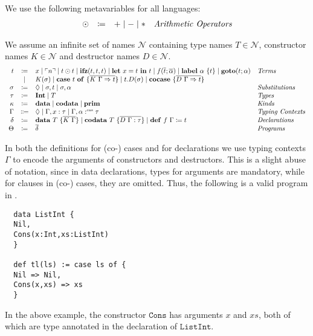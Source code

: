\begin{definition}
  We use the following metavariables for all languages:
  \[
    \begin{array}{rcll}
      \odot  & \coloneqq & + \mid - \mid * & \emph{Arithmetic Operators}
    \end{array}
  \]
\end{definition}

\begin{definition}
  We assume an infinite set of names $\mathcal{N}$ containing type names $T\in\mathcal{N}$, constructor names $K\in\mathcal{N}$ and destructor names $D\in\mathcal{N}$.
  \[ 
    \begin{array}{r c l l}
      t & \coloneqq & x \mid \lit{n} \mid t \odot t \mid \ifz{t}{t}{t} \mid \letin{x}{t}{t} \mid f(\overline{t}; \overline{\alpha}) \mid \lab{\alpha}{t} \mid \goto{t}{\alpha} & \emph{Terms}\\
      & \mid & K(\sigma) \mid \caseof{t}{\overline{K\ \Gamma \Rightarrow t}} \mid t.D(\sigma) \mid \cocase{\overline{D\ \Gamma \Rightarrow t}} & \\
      \sigma & \coloneqq & \nil \mid \sigma,t \mid \sigma, \alpha & \emph{Substitutions}\\
      \tau & \coloneqq & \tyint \mid T & \emph{Types} \\
      \kappa & \coloneq & \mathbf{data} \mid \mathbf{codata} \mid \mathbf{prim} & \emph{Kinds} \\
      \Gamma & \Coloneqq & \nil \mid \Gamma, x : \tau \mid \Gamma, \alpha \cnt \tau & \emph{Typing Contexts} \\
      \delta & \coloneqq & \mathbf{data}\ T\ \{ \overline{K\ \Gamma} \}  \mid \mathbf{codata}\ T\ \{ \overline{D\ \Gamma : \tau}\} \mid \defi{f\ \Gamma}{t} & \emph{Declarations}\\
      \Theta & \coloneqq & \overline{\delta} & \emph{Programs}\\
    \end{array}
  \]
\end{definition}

In both the definitions for (co-) cases and for declarations we use typing contexts $\Gamma$ to encode the arguments of constructors and destructors. 
This is a slight abuse of notation, since in data declarations, types for arguments are mandatory, while for clauses in (co-) cases, they are omitted.
Thus, the following is a valid program in \surfacelang{}.
\begin{example}
  \label{ex:fun-syntax}
  \begin{lstlisting}
  data ListInt { 
  Nil,
  Cons(x:Int,xs:ListInt)
  }

  def tl(ls) := case ls of { 
  Nil => Nil,
  Cons(x,xs) => xs
  }
  \end{lstlisting}
\end{example}
In the above example, the constructor $\mathtt{Cons}$ has arguments $x$ and $xs$, both of which are type annotated in the declaration of $\mathtt{ListInt}$. 

